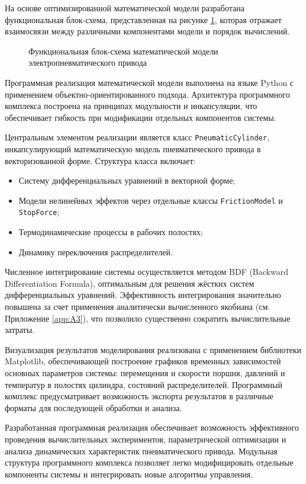 На основе оптимизированной математической модели разработана функциональная блок-схема,
представленная на рисунке \ref{fig:ch2/block_diagram}, которая отражает
взаимосвязи между различными компонентами модели и порядок вычислений.

\begin{figure}[ht]
    \caption{Функциональная блок-схема математической модели электропневматического привода}
    \label{fig:ch2/block_diagram}
\end{figure}

Программная реализация математической модели выполнена на языке Python с применением объектно-ориентированного подхода.
Архитектура программного комплекса построена на принципах модульности и инкапсуляции, что обеспечивает гибкость при модификации отдельных компонентов системы.

Центральным элементом реализации является класс \texttt{PneumaticCylinder}, инкапсулирующий
математическую модель пневматического привода в векторизованной форме. Структура класса включает:
\begin{itemize}
\item Систему дифференциальных уравнений в векторной форме;
\item Модели нелинейных эффектов через отдельные классы \texttt{FrictionModel} и \texttt{StopForce};
\item Термодинамические процессы в рабочих полостях;
\item Динамику переключения распределителей.
\end{itemize}

Численное интегрирование системы осуществляется методом BDF (Backward Differentiation Formula),
оптимальным для решения жёстких систем дифференциальных уравнений. Эффективность интегрирования
значительно повышена за счет применения аналитически вычисленного якобиана (см. Приложение \ref{app:A3}), что позволило существенно сократить вычислительные затраты.

Визуализация результатов моделирования реализована с применением библиотеки Matplotlib,
обеспечивающей построение графиков временных зависимостей основных параметров системы: перемещения
и скорости поршня, давлений и температур в полостях цилиндра, состояний распределителей. Программный
комплекс предусматривает возможность экспорта результатов в различные форматы для последующей обработки и анализа.

Разработанная программная реализация обеспечивает возможность эффективного проведения
вычислительных экспериментов, параметрической оптимизации и анализа динамических характеристик
пневматического привода. Модульная структура программного комплекса позволяет легко модифицировать
отдельные компоненты системы и интегрировать новые алгоритмы управления.